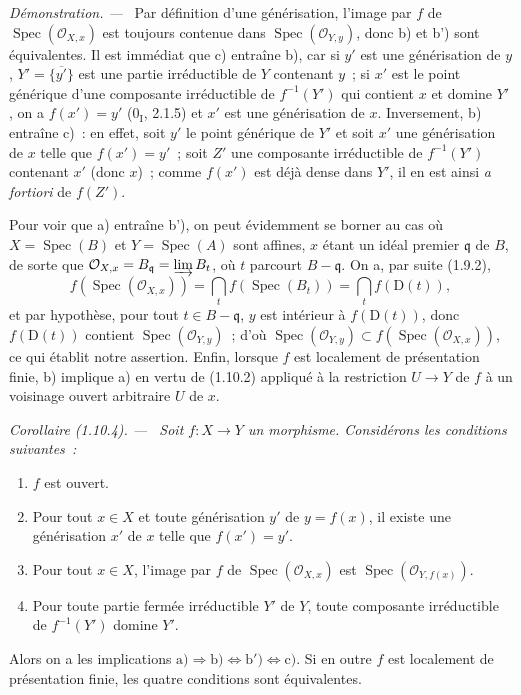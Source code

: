 \documentclass[10pt,oneside]{book}
\makeatletter
\newcommand{\setmanualcurrentlabel}[1]{\def\@currentlabel{#1}}
\newcommand{\oldpage}[2][]{%
  \setcounter{footnote}{0}%
  \marginpar{\scriptsize\textbf{#1}~|~#2}\ignorespaces}
\newenvironment{corollary}[1][]{%
  \setmanualcurrentlabel{#1}\par\medskip\noindent\itshape Corollaire (#1). ---\ }{\par}
\newenvironment{proof}{%
  \par\medskip\noindent\textit{Démonstration. ---\ }}{\par}
\makeatother
\begin{document}
\begin{proof}
Par définition d'une générisation, l'image par $f$ de
$\operatorname{Spec}(\mathcal O_{X,x})$ est toujours contenue dans
$\operatorname{Spec}(\mathcal O_{Y,y})$, donc b) et b') sont équivalentes. Il
est immédiat
que c) entraîne b), car si $y'$ est une générisation de $y$,
$Y'=\overline{\{y'\}}$ est une partie irréductible de $Y$ contenant $y$~; si
$x'$ est le point générique d'une composante irréductible de $f^{-1}(Y')$ qui
contient $x$ et domine $Y'$, on a $f(x')=y'$ ($0_{\mathrm I}$, 2.1.5) et $x'$
est une générisation de $x$. Inversement, b) entraîne c)~: en effet, soit
$y'$ le point générique de $Y'$ et soit $x'$ une générisation de $x$ telle
que $f(x')=y'$~; soit $Z'$ une composante irréductible de $f^{-1}(Y')$
contenant $x'$ (donc $x$)~; comme $f(x')$ est déjà dense dans $Y'$, il en est
ainsi \emph{a fortiori} de $f(Z')$.

Pour voir que a) entraîne b'), on peut évidemment se borner au cas où
$X=\operatorname{Spec}(B)$ et $Y=\operatorname{Spec}(A)$ sont affines, $x$
étant un idéal premier
$\mathfrak q$ de $B$, de sorte que
$\mathcal O_{X,x}=B_{\mathfrak q}=\varinjlim B_t$,
\oldpage[IV-1]{250}
où $t$ parcourt $B-\mathfrak q$. On a, par suite (1.9.2),
\[
  f(\operatorname{Spec}(\mathcal O_{X,x}))
  =\bigcap_t f(\operatorname{Spec}(B_t))=\bigcap_t f(\mathrm D(t)),
\]
et par hypothèse, pour tout $t\in B-\mathfrak q$, $y$ est intérieur à
$f(\mathrm D(t))$, donc $f(\mathrm D(t))$ contient
$\operatorname{Spec}(\mathcal O_{Y,y})$~; d'où
$\operatorname{Spec}(\mathcal O_{Y,y})
\subset f(\operatorname{Spec}(\mathcal O_{X,x}))$, ce qui établit
notre assertion. Enfin, lorsque $f$ est localement de présentation finie, b)
implique a) en vertu de (1.10.2) appliqué à la restriction $U\to Y$ de $f$ à
un voisinage ouvert arbitraire $U$ de $x$.
\end{proof}

\begin{corollary}[1.10.4]
\label{IV.1.10.4-fr}
Soit $f:X\to Y$ un morphisme. Considérons les conditions suivantes~:
\begin{enumerate}
  \item[a)] $f$ est ouvert.
  \item[b)] Pour tout $x\in X$ et toute générisation $y'$ de $y=f(x)$, il
  existe une générisation $x'$ de $x$ telle que $f(x')=y'$.
  \item[b')] Pour tout $x\in X$, l'image par $f$ de
  $\operatorname{Spec}(\mathcal O_{X,x})$ est
  $\operatorname{Spec}(\mathcal O_{Y,f(x)})$.
  \item[c)] Pour toute partie fermée irréductible $Y'$ de $Y$, toute
  composante irréductible de $f^{-1}(Y')$ domine $Y'$.
\end{enumerate}
Alors on a les implications
$\mathrm{a)}\Rightarrow\mathrm{b)}\Leftrightarrow\mathrm{b')}
\Leftrightarrow\mathrm{c)}$. Si en outre $f$ est localement de présentation
finie, les quatre conditions sont équivalentes.
\end{corollary}
\end{document}
